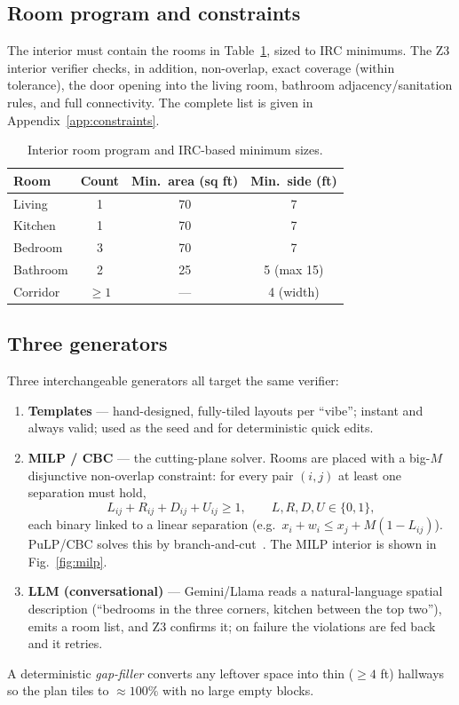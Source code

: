 \documentclass{book}
\begin{document}
\subsection{Room program and constraints}
The interior must contain the rooms in Table~\ref{tab:program}, sized to IRC minimums. The Z3 interior verifier checks, in addition, non-overlap, exact coverage (within tolerance), the door opening into the living room, bathroom adjacency/sanitation rules, and full connectivity. The complete list is given in Appendix~\ref{app:constraints}.

\begin{table}[!h]
\begin{center}
\begin{tabular}{|l|c|c|c|}
\hline
Room & Count & Min.\ area (sq ft) & Min.\ side (ft) \\
\hline
Living   & 1 & 70 & 7 \\ \hline
Kitchen  & 1 & 70 & 7 \\ \hline
Bedroom  & 3 & 70 & 7 \\ \hline
Bathroom & 2 & 25 & 5 (max 15) \\ \hline
Corridor & $\ge 1$ & --- & 4 (width) \\ \hline
\end{tabular}
\caption{Interior room program and IRC-based minimum sizes.}
\label{tab:program}
\end{center}
\end{table}

\subsection{Three generators}
Three interchangeable generators all target the same verifier:
\begin{enumerate}
\item \textbf{Templates} --- hand-designed, fully-tiled layouts per ``vibe''; instant and always valid; used as the seed and for deterministic quick edits.
\item \textbf{MILP / CBC} --- the cutting-plane solver. Rooms are placed with a big-$M$ disjunctive non-overlap constraint: for every pair $(i,j)$ at least one separation must hold,
\begin{equation}
L_{ij}+R_{ij}+D_{ij}+U_{ij}\ge 1,\qquad L,R,D,U\in\{0,1\},
\label{eq:nonoverlap}
\end{equation}
each binary linked to a linear separation (e.g.\ $x_i+w_i \le x_j + M(1-L_{ij})$). PuLP/CBC solves this by branch-and-cut~\cite{gomory1958cutting}. The MILP interior is shown in Fig.~\ref{fig:milp}.
\item \textbf{LLM (conversational)} --- Gemini/Llama reads a natural-language spatial description (``bedrooms in the three corners, kitchen between the top two''), emits a room list, and Z3 confirms it; on failure the violations are fed back and it retries.
\end{enumerate}
A deterministic \emph{gap-filler} converts any leftover space into thin ($\ge 4$ ft) hallways so the plan tiles to $\approx 100\%$ with no large empty blocks.
\end{document}
